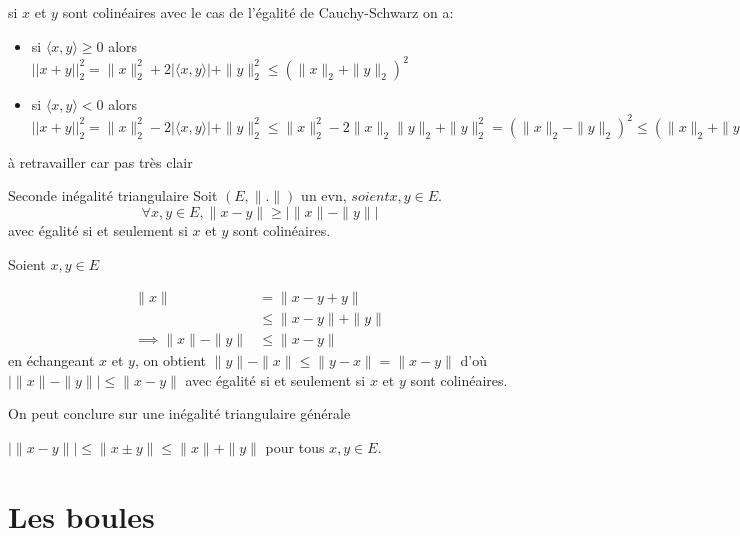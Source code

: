 \documentclass[a4paper, 12pt]{article}
\begin{document}
\begin{demonstration}
    si $x$ et $y$ sont colinéaires avec le cas de l'égalité de Cauchy-Schwarz
        on a:
        \begin{itemize}
            \item si $\langle x, y\rangle \geq 0$ alors $||x + y||_2^2 = \|x\|_2^2 + 2|\langle x, y \rangle| + \|y\|_2^2 \leq (\|x\|_2 + \|y\|_2)^2$
            \item si $\langle x, y \rangle \lt 0$ alors $||x + y||_2^2 = \|x\|_2^2 - 2|\langle x, y \rangle| + \|y\|_2^2 \leq \|x\|_2^2 - 2\|x\|_2\|y\|_2 + \|y\|_2^2 = (\|x\|_2 - \|y\|_2)^2 \leq (\|x\|_2 + \|y\|_2)^2$
        \end{itemize}
        \begin{hotwarn}
            à retravailler car pas très clair
        \end{hotwarn}
\end{demonstration}

\begin{proposition}{Seconde inégalité triangulaire}{}
    Soit $(E, \|.\|)$ un evn, $soient x, y \in E$.
    $$
    \forall x, y \in E, \|x - y\| \geq |\|x\| - \|y\||
    $$
    avec égalité si et seulement si $x$ et $y$ sont colinéaires.
\end{proposition}

\begin{demonstration}
    Soient $x, y \in E$
    
    \begin{align*}
        \|x\| &= \|x - y + y\|\\
        &\leq \|x - y\| + \|y\|\\
        \implies \|x\| - \|y\| &\leq \|x - y\|
    \end{align*}
    en échangeant $x$ et $y$, on obtient $\|y\| - \|x\| \leq \|y - x\| = \|x - y\|$
    \n
    d'où $|\|x\| - \|y\|| \leq \|x - y\|$
    avec égalité si et seulement si $x$ et $y$ sont colinéaires.
\end{demonstration}

\begin{methode}
    On peut conclure sur une inégalité triangulaire générale
    
    $|\|x - y\|| \leq \| x \pm y\| \leq \|x\| + \|y\|$
    pour tous $x, y \in E$.
\end{methode}

\section{Les boules}
\end{document}
